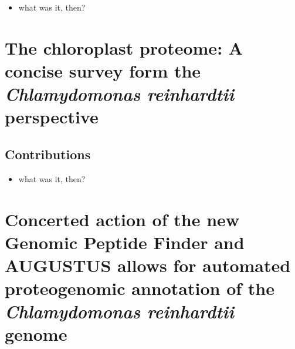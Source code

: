 \begin{itemize}
\item what was it, then?
\end{itemize}


\cleardoublepage
\section{The chloroplast proteome: A concise survey form the {\em Chlamydomonas reinhardtii} perspective}

\subsection*{Contributions}

\begin{itemize}
\item what was it, then?
\end{itemize}


\cleardoublepage
\section{Concerted action of the new Genomic Peptide Finder and AUGUSTUS allows for automated proteogenomic annotation of the {\em Chlamydomonas reinhardtii} genome}

